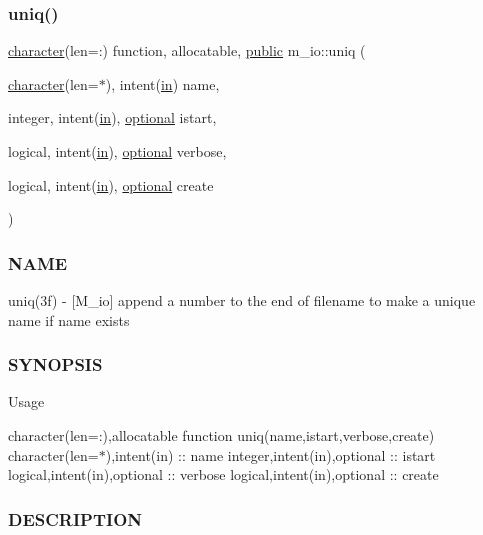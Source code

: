 \subsubsection{\texorpdfstring{uniq()}{uniq()}}
{\footnotesize\ttfamily \hyperlink{option__stopwatch_83_8txt_abd4b21fbbd175834027b5224bfe97e66}{character}(len=\+:) function, allocatable, \hyperlink{M__stopwatch_83_8txt_a2f74811300c361e53b430611a7d1769f}{public} m\+\_\+io\+::uniq (\begin{DoxyParamCaption}\item[{\hyperlink{option__stopwatch_83_8txt_abd4b21fbbd175834027b5224bfe97e66}{character}(len=$\ast$), intent(\hyperlink{M__journal_83_8txt_afce72651d1eed785a2132bee863b2f38}{in})}]{name,  }\item[{integer, intent(\hyperlink{M__journal_83_8txt_afce72651d1eed785a2132bee863b2f38}{in}), \hyperlink{option__stopwatch_83_8txt_aa4ece75e7acf58a4843f70fe18c3ade5}{optional}}]{istart,  }\item[{logical, intent(\hyperlink{M__journal_83_8txt_afce72651d1eed785a2132bee863b2f38}{in}), \hyperlink{option__stopwatch_83_8txt_aa4ece75e7acf58a4843f70fe18c3ade5}{optional}}]{verbose,  }\item[{logical, intent(\hyperlink{M__journal_83_8txt_afce72651d1eed785a2132bee863b2f38}{in}), \hyperlink{option__stopwatch_83_8txt_aa4ece75e7acf58a4843f70fe18c3ade5}{optional}}]{create }\end{DoxyParamCaption})}



\subsubsection*{N\+A\+ME}

uniq(3f) -\/ \mbox{[}M\+\_\+io\mbox{]} append a number to the end of filename to make a unique name if name exists \subsubsection*{S\+Y\+N\+O\+P\+S\+IS}

Usage

character(len=\+:),allocatable function uniq(name,istart,verbose,create) character(len=$\ast$),intent(in) \+:\+: name integer,intent(in),optional \+:\+: istart logical,intent(in),optional \+:\+: verbose logical,intent(in),optional \+:\+: create

\subsubsection*{D\+E\+S\+C\+R\+I\+P\+T\+I\+ON}

